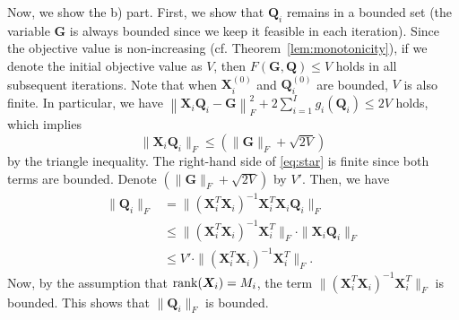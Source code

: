 \documentclass[10pt,journal]{IEEEtran}
\newcommand{\Q}{\boldsymbol{Q}}
\begin{document}
Now, we show the b) part.
First, we show that ${\bm Q}_i$ remains in a bounded set (the variable ${\bm G}$ is always bounded since we keep it feasible in each iteration). 
Since the objective value is non-increasing (cf. Theorem~\ref{lem:monotonicity}), if we denote the initial objective value as $V$, then $F({\bm G},{\bm Q}) \leq V$ holds in all subsequent iterations.  
Note that when ${\bm X}_i^{(0)}$ and ${\bm Q}_i^{(0)}$ are bounded, $V$ is also finite. 
In particular, we have $\left\| {\bm X}_i {\bm Q}_i - {\bm G} \right\|_F^2 + 2\sum_{i=1}^Ig_i(\Q_i) \leq 2V$
holds, which implies
\begin{equation}\label{eq:star}
  \| {\bm X}_i {\bm Q}_i \|_F \leq ( \| {\bm G} \|_F + \sqrt{2V} )
\end{equation}
by the triangle inequality.
The right-hand side of \eqref{eq:star} is finite since both terms are bounded. Denote $ ( \| {\bm G} \|_F + \sqrt{2V} )$ by $V'$. Then, we have
\begin{align*}
\| {\bm Q}_i \|_F &= \| ({\bm X}_i^T{\bm X}_i)^{-1} {\bm X}_i^T{\bm X}_i {\bm Q}_i \|_F\\
&\leq \| ({\bm X}_i^T{\bm X}_i)^{-1} {\bm X}_i^T \|_F \cdot \|{\bm X}_i {\bm Q}_i \|_F\\
&\leq V' \cdot \| ({\bm X}_i^T{\bm X}_i)^{-1} {\bm X}_i^T \|_F.
\end{align*} 
Now, by the assumption that ${\rm rank}({\bm X}_i)=M_i$, the term $\| ({\bm X}_i^T{\bm X}_i)^{-1} {\bm X}_i^T \|_F$ is bounded.  This shows that $\| {\bm Q}_i \|_F$ is bounded.
\end{document}
